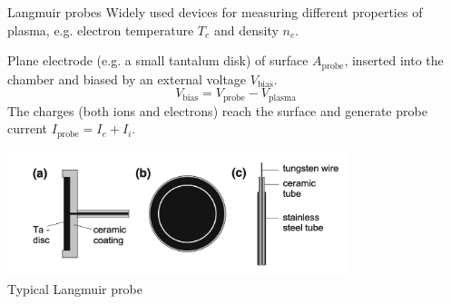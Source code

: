 \documentclass[10pt]{beamer}
\newcommand{\probecurrent}[0]{\ensuremath{I_{\mathrm{probe}}}}
\newcommand{\biasvoltage}{\ensuremath{V_{\mathrm{bias}}}}
\newcommand{\probevoltage}{\ensuremath{V_{\mathrm{probe}}}}
\newcommand{\plasmavoltage}{\ensuremath{V_{\mathrm{plasma}}}}
\begin{document}
\begin{frame}{Langmuir probes}
    Widely used devices for measuring different properties of plasma, e.g. electron temperature $T_e$ and density $n_e$.

    Plane electrode (e.g. a small tantalum disk) of surface $A_{\mathrm{probe}}$, inserted into the chamber and biased by an external voltage $\biasvoltage$.
    \begin{equation*}
        \biasvoltage= \probevoltage - \plasmavoltage
    \end{equation*}
    The charges (both ions and electrons) reach the surface and generate probe current $\probecurrent = I_e + I_i$.
    \begin{center}
        \includegraphics[width=0.75\textwidth]{../figures/langmuir_probe.png}
        \\
        Typical Langmuir probe 
    \end{center}
\end{frame}
\end{document}

